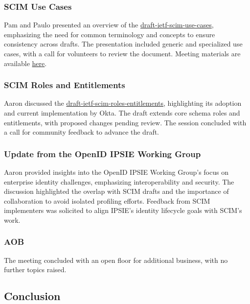 \documentclass{article}
\begin{document}
\subsubsection{SCIM Use Cases}

Pam and Paulo presented an overview of the \href{https://datatracker.ietf.org/doc/html/draft-ietf-scim-use-cases}{draft-ietf-scim-use-cases}, emphasizing the need for common terminology and concepts to ensure consistency across drafts. The presentation included generic and specialized use cases, with a call for volunteers to review the document. Meeting materials are available \href{https://datatracker.ietf.org/meeting/122/materials/slides-122-scim-use-cases}{here}.

\subsubsection{SCIM Roles and Entitlements}

Aaron discussed the \href{https://datatracker.ietf.org/doc/html/draft-ietf-scim-roles-entitlements}{draft-ietf-scim-roles-entitlements}, highlighting its adoption and current implementation by Okta. The draft extends core schema roles and entitlements, with proposed changes pending review. The session concluded with a call for community feedback to advance the draft.

\subsubsection{Update from the OpenID IPSIE Working Group}

Aaron provided insights into the OpenID IPSIE Working Group's focus on enterprise identity challenges, emphasizing interoperability and security. The discussion highlighted the overlap with SCIM drafts and the importance of collaboration to avoid isolated profiling efforts. Feedback from SCIM implementers was solicited to align IPSIE's identity lifecycle goals with SCIM's work.

\subsubsection{AOB}

The meeting concluded with an open floor for additional business, with no further topics raised.

\subsection{Conclusion}
\end{document}
